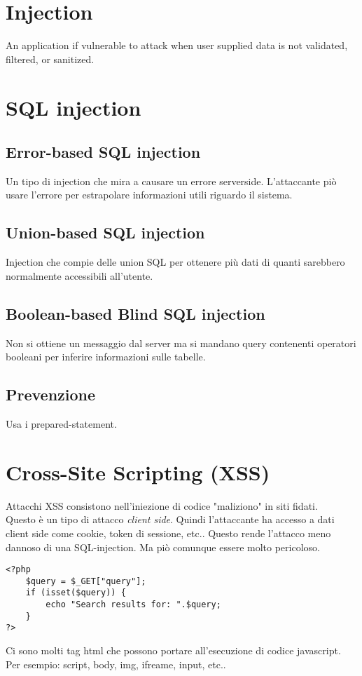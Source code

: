 \documentclass{article}
\begin{document}
\section{Injection}
An application if vulnerable to attack when user supplied data is not validated, filtered, or sanitized.

\section{SQL injection}
\subsection{Error-based SQL injection}
Un tipo di injection che mira a causare un errore serverside. L'attaccante piò usare l'errore per estrapolare informazioni utili riguardo il sistema.

\subsection{Union-based SQL injection}
Injection che compie delle union SQL per ottenere più dati di quanti sarebbero normalmente accessibili all'utente.

\subsection{Boolean-based Blind SQL injection}
Non si ottiene un messaggio dal server ma si mandano query contenenti operatori booleani per inferire informazioni sulle tabelle.

\subsection{Prevenzione}
Usa i prepared-statement.

\section{Cross-Site Scripting (XSS)}
Attacchi XSS consistono nell'iniezione di codice "maliziono" in siti fidati. \\
Questo è un tipo di attacco \textit{client side}. Quindi l'attaccante ha accesso a dati client side come cookie, token di sessione, etc..
Questo rende l'attacco meno dannoso di una SQL-injection. Ma piò comunque essere molto pericoloso.

\begin{lstlisting}
<?php
    $query = $_GET["query"];
    if (isset($query)) {
        echo "Search results for: ".$query;
    }
?>
\end{lstlisting}
Ci sono molti tag html che possono portare all'esecuzione di codice javascript. Per esempio: script, body, img, ifreame, input, etc..
\end{document}

